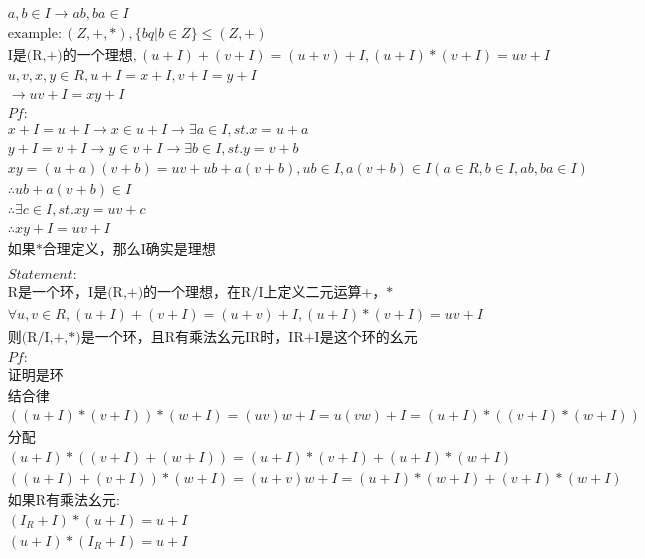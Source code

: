 \documentclass[12pt, a4paper]{article}  %
\begin{document}
\begin{align}
    &a,b \in I\rightarrow ab,ba \in I\\
    &\text{example}:(Z,+,*) ,\{bq|b\in Z\}\leqslant (Z,+)\\
    &\text{I是(R,+)的一个理想},(u+I)+(v+I)=(u+v)+I,(u+I)*(v+I)=uv+I\\
    &u,v,x,y\in R,u+I=x+I,v+I=y+I\\
    &\rightarrow uv+I=xy+I\\
    &Pf:\\
    &x+I=u+I\rightarrow x\in u+I\rightarrow \exists a\in I,st. x=u+a\\
    &y+I=v+I\rightarrow y\in v+I\rightarrow \exists b\in I,st. y=v+b\\
    & xy=(u+a)(v+b)=uv+ub+a(v+b),ub\in I,a(v+b)\in I(a\in R,b\in I,ab,ba\in I)\\
    &\therefore ub+a(v+b)\in I\\
    &\therefore \exists c\in I,st. xy=uv+c\\
    &\therefore xy+I=uv+I\\
    &\text{如果*合理定义，那么I确实是理想}\\
    & \\
    & Statement:\\
    &\text{R是一个环，I是(R,+)的一个理想，在R/I上定义二元运算+，*}\\
    &\forall u,v\in R,(u+I)+(v+I)=(u+v)+I,(u+I)*(v+I)=uv+I\\
    &\text{则(R/I,+,*)是一个环，且R有乘法幺元IR时，IR+I是这个环的幺元}\\
    &Pf:\\
    &\text{证明是环}\\
    &\text{结合律}\\
    &((u+I)*(v+I))*(w+I)=(uv)w+I=u(vw)+I=(u+I)*((v+I)*(w+I))\\
    &\text{分配}\\
    &(u+I)*((v+I)+(w+I))=(u+I)*(v+I)+(u+I)*(w+I)\\
    &((u+I)+(v+I))*(w+I)=(u+v)w+I=(u+I)*(w+I)+(v+I)*(w+I)\\
    &\text{如果R有乘法幺元:}\\
    &(I_R+I)*(u+I)=u+I\\
    &(u+I)*(I_R+I)=u+I\\
\end{align}
\end{document}
